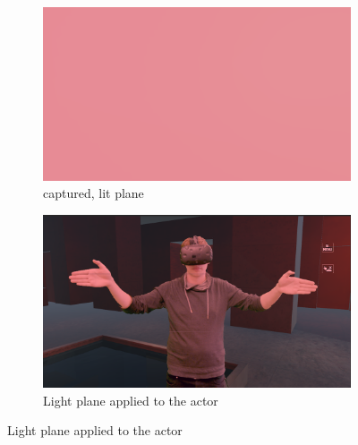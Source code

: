 \begin{figure}[htbp]
	\caption{A comparison of different composition methods in engine}
	\label{fig:light-reconstruction:diff-capture}
	\begin{subfigure}[t]{.45\textwidth}
		\centering
		\includegraphics[width=\textwidth]{gfx/recoloring/plane.png}
		\caption{captured, lit plane}
	\end{subfigure}
	\begin{subfigure}[t]{.45\textwidth}
		\centering
		\includegraphics[width=\textwidth]{gfx/recoloring/img.png}
		\caption{Light plane applied to the actor}
	\end{subfigure}
\end{figure}

